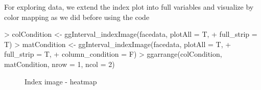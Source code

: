 \documentclass[article]{jss}
\begin{document}
For exploring data, we extend the index plot into full variables and visualize by color mapping as we did before using the code

\begin{Schunk}
\begin{Sinput}
> colCondition <- ggInterval_indexImage(facedata, plotAll = T,
+                                       full_strip = T) 
> matCondition <- ggInterval_indexImage(facedata, plotAll = T,
+                                       full_strip = T,
+                                       column_condition = F)
> ggarrange(colCondition, matCondition, nrow = 1, ncol = 2)
\end{Sinput}
\end{Schunk}

\begin{figure}[htbp]
    \centering
    \caption{\label{fig:indexImage} Index image - heatmap}
\end{figure}
\end{document}
